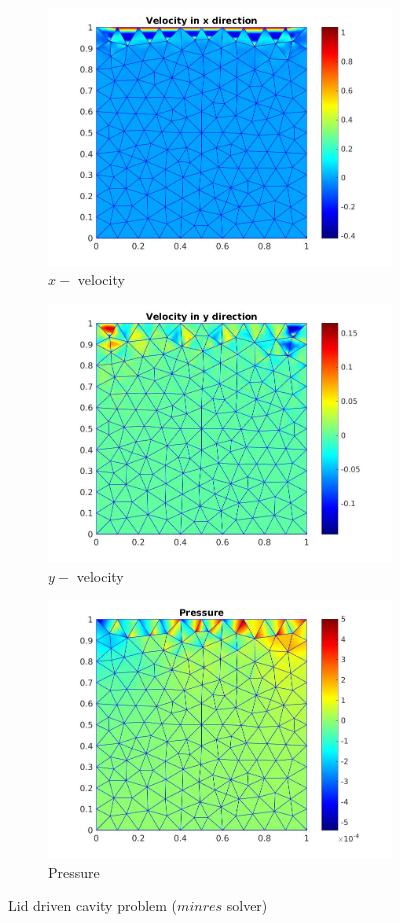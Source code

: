 \documentclass[a4paper,twoside,openright]{book}
\begin{document}
\begin{figure}
\begin{subfigure}{\textwidth}	
  \includegraphics[width=0.8\linewidth]{lid_minres_vx.jpg}
  \caption{$x-$ velocity} 
  \label{x_vel_stoke_minres_lid}
\end{subfigure}
\begin{subfigure}{\textwidth}	
  \includegraphics[width=0.8\linewidth]{lid_minres_vy.jpg}
  \caption{$y-$ velocity} 
  \label{y_vel_stoke_minres_lid}
\end{subfigure}
\begin{subfigure}{\textwidth}	
  \includegraphics[width=0.8\linewidth]{lid_minres_pressure.jpg}
  \caption{Pressure} 
  \label{pressure_stoke_minres_lid}
\end{subfigure}
\caption{Lid driven cavity problem ($minres$ solver)}
\label{stoke_minres_lid}
\end{figure}
\end{document}
